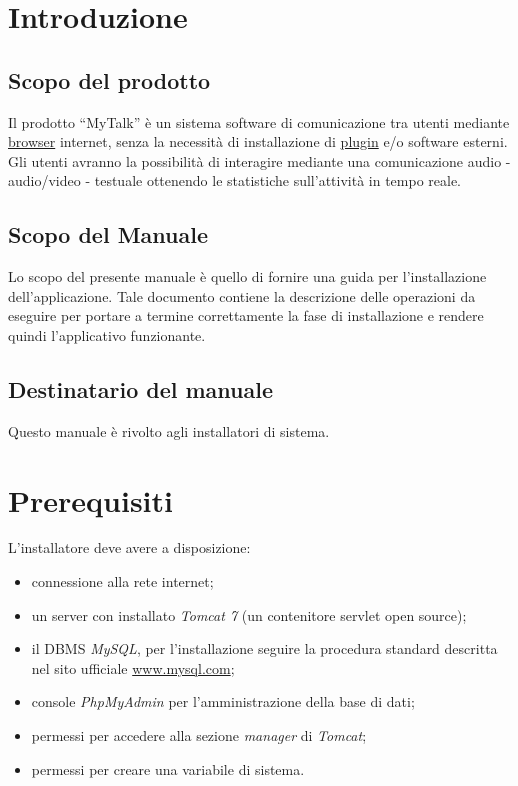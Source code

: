 

\setcounter{page}{1}
\pagestyle{normal}

\section{Introduzione}
\subsection{Scopo del prodotto}
Il prodotto ``MyTalk'' è un sistema software di comunicazione tra utenti mediante \underline{browser} internet, senza la necessità di installazione di \underline{plugin} e/o software esterni. Gli utenti avranno la possibilità di interagire mediante una comunicazione audio - audio/video - testuale ottenendo le statistiche sull'attività in tempo reale.

\subsection{Scopo del Manuale}
Lo scopo del presente manuale è quello di fornire una guida per l'installazione dell'applicazione. Tale documento contiene la descrizione delle operazioni da eseguire per portare a termine correttamente la fase di installazione e rendere quindi l'applicativo funzionante.

\subsection{Destinatario del manuale}
Questo manuale è rivolto agli installatori di sistema.

\section{Prerequisiti}
L'installatore deve avere a disposizione:
\begin{itemize}
\item connessione alla rete internet;
\item un server con installato \textit{Tomcat 7} (un contenitore servlet open source);
\item il DBMS \textit{MySQL}, per l'installazione seguire la procedura standard descritta nel sito ufficiale \url{www.mysql.com};
\item console \textit{PhpMyAdmin} per l'amministrazione della base di dati;
\item permessi per accedere alla sezione \textit{manager} di \textit{Tomcat};
\item permessi per creare una variabile di sistema.
\end{itemize} 

